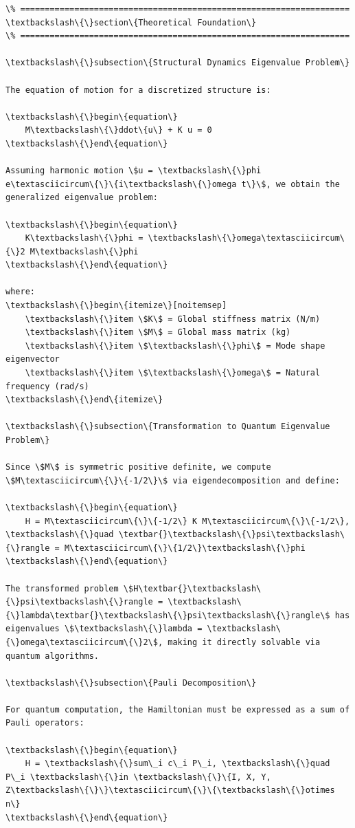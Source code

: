 \documentclass[12pt, a4paper]{article}
\begin{document}
\begin{lstlisting}[style=codestyle, caption={VQA\_Modal\_Analysis\_Report.tex}]
\% ===================================================================
\textbackslash\{\}section\{Theoretical Foundation\}
\% ===================================================================

\textbackslash\{\}subsection\{Structural Dynamics Eigenvalue Problem\}

The equation of motion for a discretized structure is:

\textbackslash\{\}begin\{equation\}
    M\textbackslash\{\}ddot\{u\} + K u = 0
\textbackslash\{\}end\{equation\}

Assuming harmonic motion \$u = \textbackslash\{\}phi e\textasciicircum\{\}\{i\textbackslash\{\}omega t\}\$, we obtain the generalized eigenvalue problem:

\textbackslash\{\}begin\{equation\}
    K\textbackslash\{\}phi = \textbackslash\{\}omega\textasciicircum\{\}2 M\textbackslash\{\}phi
\textbackslash\{\}end\{equation\}

where:
\textbackslash\{\}begin\{itemize\}[noitemsep]
    \textbackslash\{\}item \$K\$ = Global stiffness matrix (N/m)
    \textbackslash\{\}item \$M\$ = Global mass matrix (kg)
    \textbackslash\{\}item \$\textbackslash\{\}phi\$ = Mode shape eigenvector
    \textbackslash\{\}item \$\textbackslash\{\}omega\$ = Natural frequency (rad/s)
\textbackslash\{\}end\{itemize\}

\textbackslash\{\}subsection\{Transformation to Quantum Eigenvalue Problem\}

Since \$M\$ is symmetric positive definite, we compute \$M\textasciicircum\{\}\{-1/2\}\$ via eigendecomposition and define:

\textbackslash\{\}begin\{equation\}
    H = M\textasciicircum\{\}\{-1/2\} K M\textasciicircum\{\}\{-1/2\}, \textbackslash\{\}quad \textbar{}\textbackslash\{\}psi\textbackslash\{\}rangle = M\textasciicircum\{\}\{1/2\}\textbackslash\{\}phi
\textbackslash\{\}end\{equation\}

The transformed problem \$H\textbar{}\textbackslash\{\}psi\textbackslash\{\}rangle = \textbackslash\{\}lambda\textbar{}\textbackslash\{\}psi\textbackslash\{\}rangle\$ has eigenvalues \$\textbackslash\{\}lambda = \textbackslash\{\}omega\textasciicircum\{\}2\$, making it directly solvable via quantum algorithms.

\textbackslash\{\}subsection\{Pauli Decomposition\}

For quantum computation, the Hamiltonian must be expressed as a sum of Pauli operators:

\textbackslash\{\}begin\{equation\}
    H = \textbackslash\{\}sum\_i c\_i P\_i, \textbackslash\{\}quad P\_i \textbackslash\{\}in \textbackslash\{\}\{I, X, Y, Z\textbackslash\{\}\}\textasciicircum\{\}\{\textbackslash\{\}otimes n\}
\textbackslash\{\}end\{equation\}


\end{lstlisting}
\end{document}
